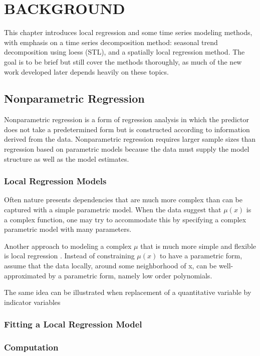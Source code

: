 \chapter{BACKGROUND}

This chapter introduces local regression and some time series modeling methods,
with emphasis on a time series decomposition method: seasonal trend decomposition
using loess (STL), and a spatially local regression method. The goal is to be
brief but still cover the methods thoroughly, as much of the new work developed
later depends heavily on these topics.

\section{Nonparametric Regression}

Nonparametric regression is a form of regression analysis in which the predictor 
does not take a predetermined form but is constructed according to information
derived from the data. Nonparametric regression requires larger sample sizes 
than regression based on parametric models because the data must supply the 
model structure as well as the model estimates.

\subsection{Local Regression Models}

Often nature presents dependencies that are much more complex than can be captured
with a simple parametric model. When the data suggest that $\mu(x)$ is a complex
function, one may try to accommodate this by specifying a complex parametric model
with many parameters.

Another approach to modeling a complex $\mu$ that is much more simple and flexible
is local regression \cite{Cleveland:1979}. Instead of constraining $\mu(x)$ to 
have a parametric form, assume that the data locally, around some neighborhood of
x, can be well-approximated by a parametric form, namely low order polynomials.

The same idea can be illustrated when replacement of a quantitative variable by
indicator variables 

\subsection{Fitting a Local Regression Model}
\label{sec:loess}

\subsection{Computation}

